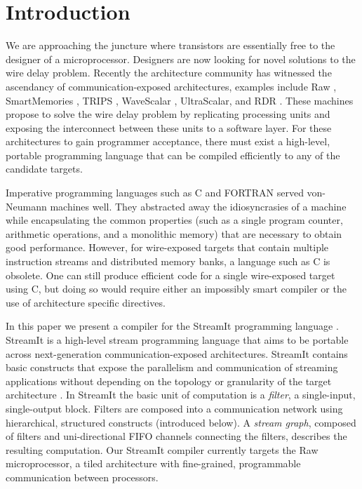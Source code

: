\section{Introduction}

We are approaching the juncture where transistors are essentially free
to the designer of a microprocessor.  Designers are now looking for
novel solutions to the wire delay problem. Recently the architecture
community has witnessed the ascendancy of communication-exposed
architectures, examples include Raw
\cite{raw}, SmartMemories \cite{smartmemories}, TRIPS \cite{trips},
WaveScalar \cite{wavescalar}, UltraScalar, and RDR \cite{rdr}.  These
machines propose to solve the wire delay problem by replicating
processing units and exposing the interconnect between these units to
a software layer.  For these architectures to gain programmer
acceptance, there must exist a high-level, portable programming
language that can be compiled efficiently to any of the candidate
targets.  

Imperative programming languages such as C and FORTRAN served
von-Neumann machines well.  They abstracted away the idiosyncrasies of
a machine while encapsulating the common properties (such as a single
program counter, arithmetic operations, and a monolithic memory) that
are necessary to obtain good performance.  However, for wire-exposed
targets that contain multiple instruction streams and distributed
memory banks, a language such as C is obsolete.  One can
still produce efficient code for a single wire-exposed target using C,
but doing so would require either an impossibly smart compiler or the use
of architecture specific directives.  

In this paper we present a compiler for the StreamIt programming
language \cite{streamitcc}.  StreamIt is a high-level stream
programming language that aims to be portable across next-generation
communication-exposed architectures.  StreamIt contains basic
constructs that expose the parallelism and communication of streaming
applications without depending on the topology or granularity of the
target architecture \cite{streamit-asplos}. In StreamIt the basic unit
of computation is a {\it filter}, a single-input, single-output block.
Filters are composed into a communication network using hierarchical,
structured constructs (introduced below).  A {\it stream graph},
composed of filters and uni-directional FIFO channels connecting the
filters, describes the resulting computation. Our StreamIt compiler
currently targets the Raw microprocessor, a tiled architecture with
fine-grained, programmable communication between processors.

